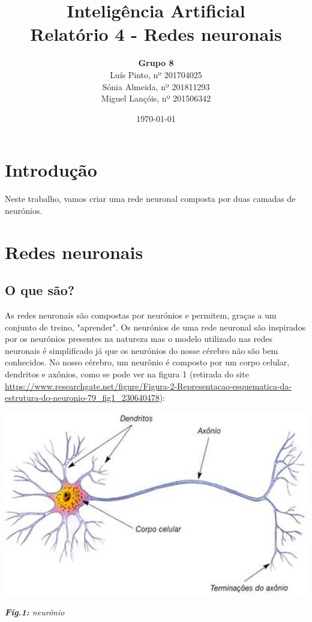 \documentclass{article}
\title{\textbf{Inteligência Artificial\\Relatório 4 - Redes neuronais}}
\author{\textbf{Grupo 8}\\[4mm]Luís Pinto, nº 201704025\\Sónia Almeida, nº 201811293\\Miguel Lançóis, nº 201506342}
\date{\today}
\begin{document}
\maketitle
\newpage
\tableofcontents
\clearpage
\pagestyle{fancy}
\fancyhf{}
\setlength{\headheight}{30pt}
\setlength{\footskip}{15pt}
\rfoot{\thepage}
\section{Introdução}
\hspace{10mm}Neste trabalho, vamos criar uma rede neuronal composta por duas camadas de neurónios.
\section{Redes neuronais}
\subsection{O que são?}
\hspace{10mm}As redes neuronais são compostas por neurónios e permitem, graças a um conjunto de treino, "aprender". Os neurónios de uma rede neuronal são inspirados por os neurónios presentes na natureza mas o modelo utilizado nas redes neuronais é simplificado já que os neurónios do nosse cérebro não são bem conhecidos. No nosso cérebro, um neurônio é composto por um corpo celular, dendritos e axônios, como se pode ver na figura 1 (retirada do site \url{https://www.researchgate.net/figure/Figura-2-Representacao-esquematica-da-estrutura-do-neuronio-79_fig1_230640478}):


\begin{center} \includegraphics[scale=0.75]{neuronio.png} \end{center}
\begin{center} \textit{\textbf{Fig.1:} neurônio }
\end{center}
\end{document}

